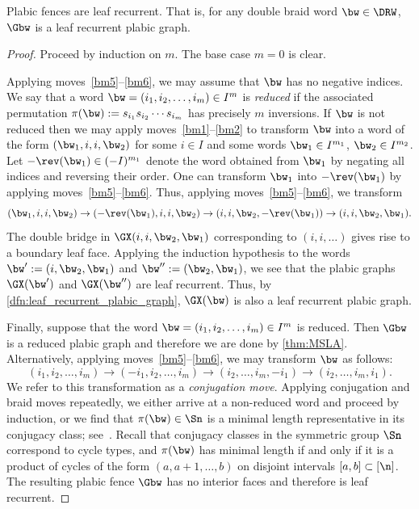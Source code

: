 \begin{proposition}
Plabic fences are leaf recurrent. That is, for any double braid word $\bw\in\DRW$, $\Gbw$ is a leaf recurrent plabic graph.
\end{proposition}
\begin{proof}
Proceed by induction on $m$. The base case $m=0$ is clear.

Applying moves~\ref{bm5}--\ref{bm6}, we may assume that $\bw$ has no negative indices. We say that a word $\bw=(i_1,i_2,\dots,i_m)\in I^m$ is \emph{reduced} if the associated permutation $\pi(\bw):=s_{i_1}s_{i_2}\cdots s_{i_m}$ has precisely $m$ inversions. If $\bw$ is not reduced then we may apply moves~\ref{bm1}--\ref{bm2} to transform $\bw$ into a word of the form $(\bw_1,i,i,\bw_2)$ for some $i\in I$ and some words $\bw_1\in I^{m_1}$, $\bw_2\in I^{m_2}$. Let $-\rev(\bw_1)\in (-I)^{m_1}$ denote the word obtained from $\bw_1$ by negating all indices and reversing their order. One can transform $\bw_1$ into $-\rev(\bw_1)$ by applying moves~\ref{bm5}--\ref{bm6}. Thus, applying moves~\ref{bm5}--\ref{bm6}, we transform
\begin{equation*}%
  (\bw_1,i,i,\bw_2)\to (-\rev(\bw_1),i,i,\bw_2)\to (i,i,\bw_2,-\rev(\bw_1)) \to (i,i,\bw_2,\bw_1).
\end{equation*}  The double bridge in $\GX(i,i,\bw_2,\bw_1)$ corresponding to $(i,i,\dots)$ gives rise to a boundary leaf face. Applying the induction hypothesis to the words $\bw':=(i,\bw_2,\bw_1)$ and $\bw'':=(\bw_2,\bw_1)$, we see that the plabic graphs $\GX(\bw')$ and $\GX(\bw'')$ are leaf recurrent. Thus, by \cref{dfn:leaf_recurrent_plabic_graph}, $\GX(\bw)$ is also a leaf recurrent plabic graph.

Finally, suppose that the word $\bw=(i_1,i_2,\dots,i_m)\in I^m$ is reduced. Then $\Gbw$ is a reduced plabic graph and therefore we are done by \cref{thm:MSLA}. Alternatively, applying moves~\ref{bm5}--\ref{bm6}, we may transform $\bw$ as follows:
\begin{equation*}%
  (i_1,i_2,\dots,i_m) \to (-i_1,i_2,\dots,i_m) \to (i_2,\dots,i_m,-i_1)\to (i_2,\dots,i_m,i_1).
\end{equation*}
We refer to this transformation as a \emph{conjugation move}. Applying conjugation and braid moves repeatedly, we either arrive at a non-reduced word and proceed by induction, or we find that $\pi(\bw)\in\Sn$ is a minimal length representative in its conjugacy class; see~\cite[Theorem~1.1]{GePf}. Recall that conjugacy classes in the symmetric group $\Sn$ correspond to cycle types, and $\pi(\bw)$ has minimal length  if and only if it is a product of cycles of the form $(a,a+1,\dots,b)$ on disjoint intervals $[a,b]\subset[\n]$. The resulting plabic fence $\Gbw$ has no interior faces and therefore is leaf recurrent.
\end{proof}
